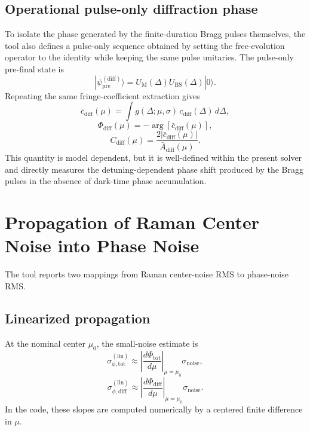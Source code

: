\documentclass[11pt]{article}
\begin{document}
\subsection{Operational pulse-only diffraction phase}
To isolate the phase generated by the finite-duration Bragg pulses themselves, the tool also defines a pulse-only sequence obtained by setting the free-evolution operator to the identity while keeping the same pulse unitaries. The pulse-only pre-final state is
\begin{equation}
|\psi_{\mathrm{pre}}^{(\mathrm{diff})}\rangle
=
U_{\mathrm{M}}(\Delta)
U_{\mathrm{BS}}(\Delta)
|0\rangle.
\label{eq:pulse_only_state}
\end{equation}
Repeating the same fringe-coefficient extraction gives
\begin{equation}
\bar{c}_{\mathrm{diff}}(\mu)
=
\int g(\Delta;\mu,\sigma)\,c_{\mathrm{diff}}(\Delta)\,d\Delta,
\label{eq:ensemble_diff_c}
\end{equation}
\begin{equation}
\Phi_{\mathrm{diff}}(\mu)
=
-\arg\!\left[\bar{c}_{\mathrm{diff}}(\mu)\right],
\label{eq:ensemble_diff_phase}
\end{equation}
\begin{equation}
C_{\mathrm{diff}}(\mu)
=
\frac{2\left|\bar{c}_{\mathrm{diff}}(\mu)\right|}{\bar{A}_{\mathrm{diff}}(\mu)}.
\label{eq:diff_contrast}
\end{equation}
This quantity is model dependent, but it is well-defined within the present solver and directly measures the detuning-dependent phase shift produced by the Bragg pulses in the absence of dark-time phase accumulation.

\section{Propagation of Raman Center Noise into Phase Noise}
The tool reports two mappings from Raman center-noise RMS to phase-noise RMS.

\subsection{Linearized propagation}
At the nominal center $\mu_0$, the small-noise estimate is
\begin{equation}
\sigma_{\phi,\mathrm{tot}}^{(\mathrm{lin})}
\approx
\left|\frac{d\Phi_{\mathrm{tot}}}{d\mu}\right|_{\mu=\mu_0}
\sigma_{\mathrm{noise}},
\label{eq:linear_total_noise}
\end{equation}
\begin{equation}
\sigma_{\phi,\mathrm{diff}}^{(\mathrm{lin})}
\approx
\left|\frac{d\Phi_{\mathrm{diff}}}{d\mu}\right|_{\mu=\mu_0}
\sigma_{\mathrm{noise}}.
\label{eq:linear_diff_noise}
\end{equation}
In the code, these slopes are computed numerically by a centered finite difference in $\mu$.
\end{document}
